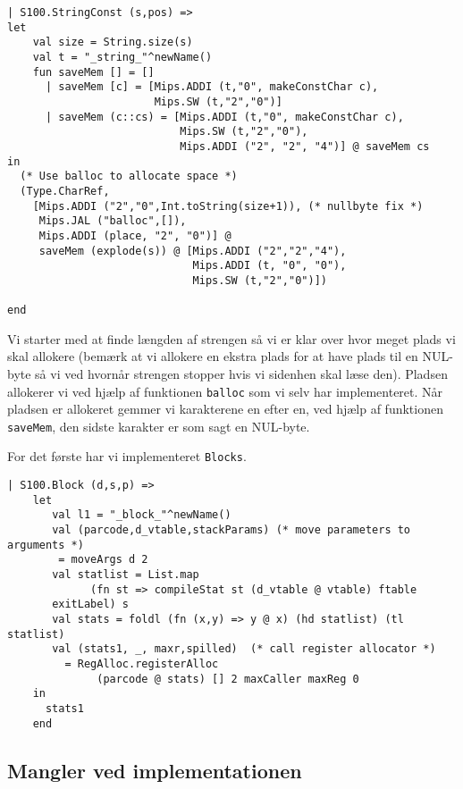 \documentclass[12pt]{article}
\begin{document}
\begin{verbatim}
| S100.StringConst (s,pos) =>
let
    val size = String.size(s)
    val t = "_string_"^newName()
    fun saveMem [] = []
      | saveMem [c] = [Mips.ADDI (t,"0", makeConstChar c),
                       Mips.SW (t,"2","0")]
      | saveMem (c::cs) = [Mips.ADDI (t,"0", makeConstChar c),
                           Mips.SW (t,"2","0"),
                           Mips.ADDI ("2", "2", "4")] @ saveMem cs
in 
  (* Use balloc to allocate space *)
  (Type.CharRef,
    [Mips.ADDI ("2","0",Int.toString(size+1)), (* nullbyte fix *)
     Mips.JAL ("balloc",[]), 
     Mips.ADDI (place, "2", "0")] @
     saveMem (explode(s)) @ [Mips.ADDI ("2","2","4"),
                             Mips.ADDI (t, "0", "0"),
                             Mips.SW (t,"2","0")])              
           
end
\end{verbatim}

Vi starter med at finde længden af strengen så vi er klar over hvor meget plads
vi skal allokere (bemærk at vi allokere en ekstra
plads for at have plads til en NUL-byte så vi ved hvornår strengen stopper hvis
vi sidenhen skal læse den). Pladsen allokerer vi ved hjælp af funktionen
\texttt{balloc} som vi selv har implementeret. Når pladsen er allokeret gemmer
vi karakterene en efter en, ved hjælp af funktionen \texttt{saveMem}, den sidste
karakter er som sagt en NUL-byte. 

For det første har vi implementeret \texttt{Blocks}. 

\begin{verbatim}
| S100.Block (d,s,p) => 
    let
       val l1 = "_block_"^newName()
       val (parcode,d_vtable,stackParams) (* move parameters to arguments *)
        = moveArgs d 2
       val statlist = List.map 
             (fn st => compileStat st (d_vtable @ vtable) ftable
       exitLabel) s
       val stats = foldl (fn (x,y) => y @ x) (hd statlist) (tl statlist)
       val (stats1, _, maxr,spilled)  (* call register allocator *)
         = RegAlloc.registerAlloc
              (parcode @ stats) [] 2 maxCaller maxReg 0
    in
      stats1
    end
\end{verbatim}


\subsection{Mangler ved implementationen}
\end{document}
